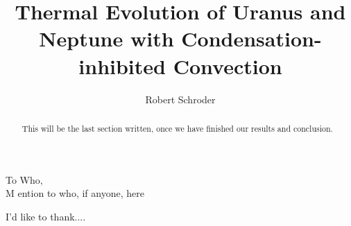 \documentclass[11pt]{ucscthesisbs}
\begin{document}

\title{Thermal Evolution of Uranus and Neptune with Condensation-inhibited Convection}
\author{Robert Schroder}
%
%





\maketitle
\copyrightpage

\begin{frontmatter}

\begin{abstract}
This will be the last section written, once we have finished our results and conclusion.
\end{abstract}

\tableofcontents
%
%
\listoffigures
\listoftables

\begin{dedication}
\null\vfil
{\large
\begin{center}
To Who,\\\vspace{12pt}
M  ention to who, if anyone, here
\end{center}}
\vfil\null
\end{dedication}

\begin{acknowledgements}
I'd like to thank....
\end{acknowledgements}


\end{frontmatter}

\end{document}
